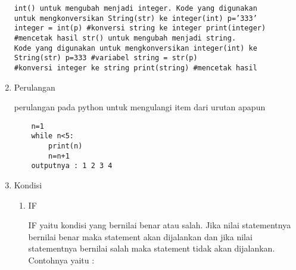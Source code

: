 \documentclass{article}
\begin{document}
\begin{enumerate}
\begin{verbatim}
int() untuk mengubah menjadi integer. Kode yang digunakan 
untuk mengkonversikan String(str) ke integer(int) p=’333’ 
integer = int(p) #konversi string ke integer print(integer) 
#mencetak hasil str() untuk mengubah menjadi string. 
Kode yang digunakan untuk mengkonversikan integer(int) ke 
String(str) p=333 #variabel string = str(p) 
#konversi integer ke string print(string) #mencetak hasil
\end{verbatim}
\item Perulangan
\par perulangan pada python untuk mengulangi item dari urutan apapun
\begin{verbatim}
	n=1
	while n<5:
		print(n)
		n=n+1
	outputnya : 1 2 3 4 
\end{verbatim}
\item Kondisi
\begin{enumerate}
\item IF
\par IF yaitu kondisi yang bernilai benar atau salah. Jika nilai statementnya bernilai benar maka statement akan dijalankan dan jika nilai statementnya bernilai salah maka statement tidak akan dijalankan. Contohnya yaitu :


\end{enumerate}
\end{enumerate}
\end{document}
